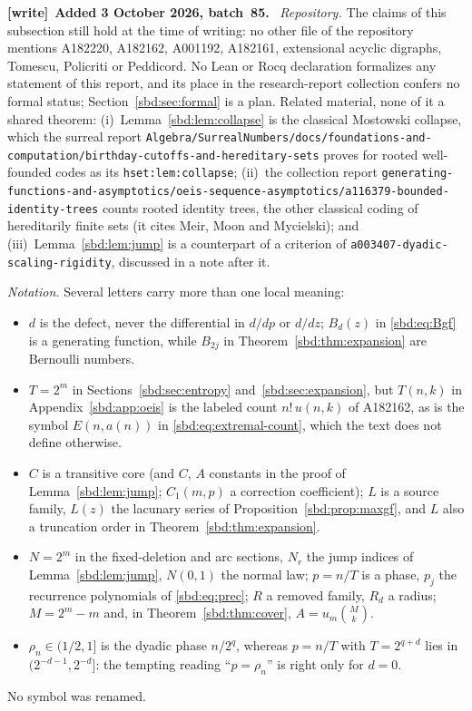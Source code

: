 \documentclass[11pt,a4paper]{article}
\theoremstyle{definition}
\newenvironment{writenote}[1][]{\par\smallskip\begingroup\small
 \noindent\textbf{[write]}\if\relax\detokenize{#1}\relax\else~\textbf{#1.}\fi\ }%
 {\par\endgroup\smallskip}
\begin{document}
\begin{writenote}[Added 3 October 2026, batch~85]
\emph{Repository.} The claims of this subsection still hold at the time
of writing: no other file of the repository mentions A182220, A182162,
A001192, A182161, extensional acyclic digraphs, Tomescu, Policriti or
Peddicord. No Lean or Rocq declaration formalizes any statement of this
report, and its place in the research-report collection confers no formal
status; Section~\ref{sbd:sec:formal} is a plan. Related material, none of
it a shared theorem:
(i)~Lemma~\ref{sbd:lem:collapse} is the classical Mostowski collapse, which
the surreal report
\nolinkurl{Algebra/SurrealNumbers/docs/foundations-and-computation/birthday-cutoffs-and-hereditary-sets}
proves for rooted well-founded codes as its \nolinkurl{hset:lem:collapse};
(ii)~the collection report
\nolinkurl{generating-functions-and-asymptotics/oeis-sequence-asymptotics/a116379-bounded-identity-trees}
counts rooted identity trees, the other classical coding of hereditarily
finite sets (it cites Meir, Moon and Mycielski); and
(iii)~Lemma~\ref{sbd:lem:jump} is a counterpart of a criterion of
\nolinkurl{a003407-dyadic-scaling-rigidity}, discussed in a note after it.

\emph{Notation.} Several letters carry more than one local meaning:
\begin{itemize}
\item $d$ is the defect, never the differential in $d/dp$ or $d/dz$;
 $B_d(z)$ in \eqref{sbd:eq:Bgf} is a generating function, while
 $B_{2j}$ in Theorem~\ref{sbd:thm:expansion} are Bernoulli numbers.
\item $T=2^m$ in Sections~\ref{sbd:sec:entropy} and~\ref{sbd:sec:expansion},
 but $T(n,k)$ in Appendix~\ref{sbd:app:oeis} is the labeled count
 $n!\,u(n,k)$ of A182162, as is the symbol $E(n,a(n))$ in
 \eqref{sbd:eq:extremal-count}, which the text does not define otherwise.
\item $C$ is a transitive core (and $C$, $A$ constants in the proof of
 Lemma~\ref{sbd:lem:jump}; $C_1(m,p)$ a correction coefficient);
 $L$ is a source family, $L(z)$ the lacunary series of
 Proposition~\ref{sbd:prop:maxgf}, and $L$ also a truncation order in
 Theorem~\ref{sbd:thm:expansion}.
\item $N=2^m$ in the fixed-deletion and arc sections, $N_r$ the jump
 indices of Lemma~\ref{sbd:lem:jump}, $N(0,1)$ the normal law;
 $p=n/T$ is a phase, $p_j$ the recurrence polynomials of
 \eqref{sbd:eq:prec}; $R$ a removed family, $R_d$ a radius; $M=2^m-m$
 and, in Theorem~\ref{sbd:thm:cover}, $A=u_m\binom Mk$.
\item $\rho_n\in(1/2,1]$ is the dyadic phase $n/2^{q}$, whereas $p=n/T$
 with $T=2^{q+d}$ lies in $(2^{-d-1},2^{-d}]$: the tempting reading
 ``$p=\rho_n$'' is right only for $d=0$.
\end{itemize}
No symbol was renamed.
\end{writenote}
\end{document}
